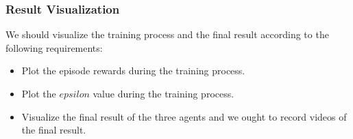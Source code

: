 \documentclass[aps,letterpaper,10pt]{revtex4}
\begin{document}
\subsubsection{Result Visualization} We should visualize the training process and the final result according to the following requirements:
\begin{itemize}
    \item Plot the episode rewards during the training process.
    \item Plot the $epsilon$ value during the training process.
    \item Visualize the final result of the three agents and we ought to record videos of the final result. 
\end{itemize}
\begin{figure}[H]
	  \centering
	   
	  \label{fig:oscil}
	\end{figure}
\begin{figure}[H]
	  \centering
	   
	  \label{fig:oscil}
	\end{figure}
\begin{figure}[H]
	  \centering
	   
	  \label{fig:oscil}
	\end{figure}
\end{document}
